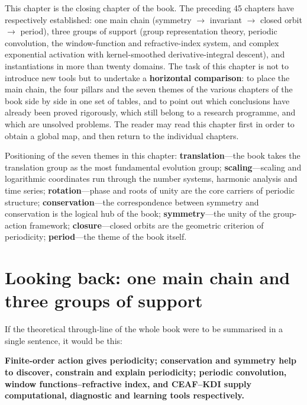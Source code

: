 \begin{remark}\label{rem:summary_chapter_positioning}
This chapter is the closing chapter of the book. The preceding 45 chapters have respectively established: one main chain (symmetry $\to$ invariant $\to$ closed orbit $\to$ period), three groups of support (group representation theory, periodic convolution, the window-function and refractive-index system, and complex exponential activation with kernel-smoothed derivative-integral descent), and instantiations in more than twenty domains. The task of this chapter is not to introduce new tools but to undertake a \textbf{horizontal comparison}: to place the main chain, the four pillars and the seven themes of the various chapters of the book side by side in one set of tables, and to point out which conclusions have already been proved rigorously, which still belong to a research programme, and which are unsolved problems. The reader may read this chapter first in order to obtain a global map, and then return to the individual chapters.

Positioning of the seven themes in this chapter: \textbf{translation}---the book takes the translation group as the most fundamental evolution group; \textbf{scaling}---scaling and logarithmic coordinates run through the number systems, harmonic analysis and time series; \textbf{rotation}---phase and roots of unity are the core carriers of periodic structure; \textbf{conservation}---the correspondence between symmetry and conservation is the logical hub of the book; \textbf{symmetry}---the unity of the group-action framework; \textbf{closure}---closed orbits are the geometric criterion of periodicity; \textbf{period}---the theme of the book itself.
\end{remark}

\section{Looking back: one main chain and three groups of support}

If the theoretical through-line of the whole book were to be summarised in a single sentence, it would be this:

\begin{center}
\textbf{Finite-order action gives periodicity; conservation and symmetry help to discover, constrain and explain periodicity; periodic convolution, window functions--refractive index, and CEAF--KDI supply computational, diagnostic and learning tools respectively.}
\end{center}

